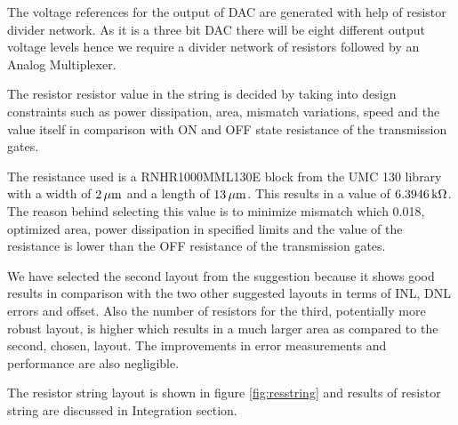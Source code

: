 \documentclass[parskip,oneside,colorbacktitle,10pt,accentcolor=tud1b]{tudreport}
\begin{document}
{The voltage references for the output of DAC are generated with help of resistor divider network. As it is a three bit DAC there will be eight different output voltage levels hence we require a divider network of resistors followed by an Analog Multiplexer. 

The resistor resistor value in the string is decided by taking into design constraints such as power dissipation, area, mismatch variations, speed and the value itself in comparison with ON and OFF state resistance of the transmission gates. 

The resistance used is a RNHR1000MML130E block from the UMC 130 library with a width of $\unit[2]{\mu m}$ and a length of $\unit[13]{\mu m}$. This results in a value of $\unit[6.3946]{k\Omega}$. The reason behind selecting this value is to minimize mismatch which 0.018, optimized area, power dissipation in specified limits and the value of the resistance is lower than the OFF resistance of the transmission gates. 

We have selected the second layout from the suggestion because it shows good results in comparison with the two other suggested layouts in terms of INL, DNL errors and offset. Also the number of resistors for the third, potentially more robust layout, is higher which results in a much larger area as compared to the second, chosen, layout. The improvements in error measurements and performance are also negligible. 

The resistor string layout is shown in figure \ref{fig:resstring} and results of resistor string are discussed in Integration section.

}
\end{document}
